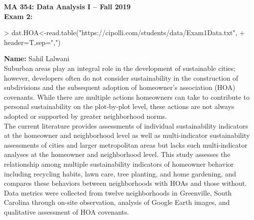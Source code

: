 \documentclass{article}
\begin{document}

\noindent \textbf{MA 354: Data Analysis I -- Fall 2019}\\%
\noindent \textbf{Exam 2:}\vspace{1em}\\

\begin{Schunk}
\begin{Sinput}
> dat.HOA<-read.table("https://cipolli.com/students/data/Exam1Data.txt",
+               header=T,sep=",")
\end{Sinput}
\end{Schunk}

\textbf{Name:} Sahil Lalwani\\

Suburban areas play an integral role in the development of sustainable cities; however, developers often do not consider sustainability in the construction of subdivisions and the subsequent adoption of homeowner's association (HOA) covenants. While there are multiple actions homeowners can take to contribute to personal sustainability on the plot-by-plot level, these actions are not always adopted or supported by greater neighborhood norms. \\

The current literature provides assessments of individual sustainability indicators at the homeowner and neighborhood level as well as multi-indicator sustainability assessments of cities and larger metropolitan areas but lacks such multi-indicator analyses at the homeowner and neighborhood level. This study assesses the relationship among multiple sustainability indicators of homeowner behavior including recycling habits, lawn care, tree planting, and home gardening, and compares these behaviors between neighborhoods with HOAs and those without. Data metrics were collected from twelve neighborhoods in Greenville, South Carolina through on-site observation, analysis of Google Earth images, and qualitative assessment of HOA covenants.\\
\end{document}
